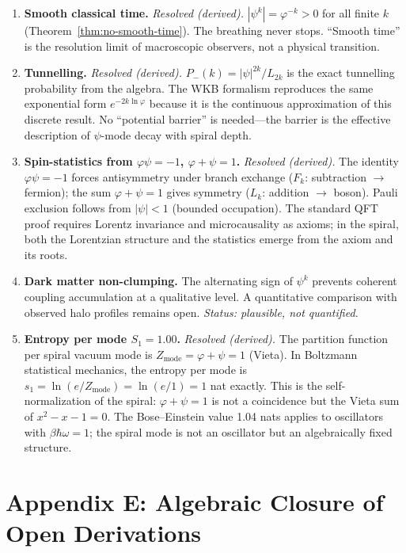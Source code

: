 \documentclass[12pt,a4paper]{article}
\begin{document}
\begin{enumerate}
\item \textbf{Smooth classical time.} \emph{Resolved (derived).} $|\psi^k| = \varphi^{-k} > 0$ for all finite $k$ (Theorem~\ref{thm:no-smooth-time}). The breathing never stops. ``Smooth time'' is the resolution limit of macroscopic observers, not a physical transition.

\item \textbf{Tunnelling.} \emph{Resolved (derived).} $P_-(k) = |\psi|^{2k}/L_{2k}$ is the exact tunnelling probability from the algebra. The WKB formalism reproduces the same exponential form $e^{-2k\ln\varphi}$ because it is the continuous approximation of this discrete result. No ``potential barrier'' is needed---the barrier is the effective description of $\psi$-mode decay with spiral depth.

\item \textbf{Spin-statistics from $\varphi\psi = -1$, $\varphi+\psi = 1$.} \emph{Resolved (derived).} The identity $\varphi\psi = -1$ forces antisymmetry under branch exchange ($F_k$: subtraction $\to$ fermion); the sum $\varphi+\psi = 1$ gives symmetry ($L_k$: addition $\to$ boson). Pauli exclusion follows from $|\psi| < 1$ (bounded occupation). The standard QFT proof requires Lorentz invariance and microcausality as axioms; in the spiral, both the Lorentzian structure and the statistics emerge from the axiom and its roots.

\item \textbf{Dark matter non-clumping.} The alternating sign of $\psi^k$ prevents coherent coupling accumulation at a qualitative level. A quantitative comparison with observed halo profiles remains open. \emph{Status: plausible, not quantified.}

\item \textbf{Entropy per mode $S_1 = 1.00$.} \emph{Resolved (derived).} The partition function per spiral vacuum mode is $Z_{\mathrm{mode}} = \varphi + \psi = 1$ (Vieta). In Boltzmann statistical mechanics, the entropy per mode is $s_1 = \ln(e/Z_{\mathrm{mode}}) = \ln(e/1) = 1$ nat exactly. This is the self-normalization of the spiral: $\varphi + \psi = 1$ is not a coincidence but the Vieta sum of $x^2 - x - 1 = 0$. The Bose--Einstein value 1.04 nats applies to oscillators with $\beta\hbar\omega = 1$; the spiral mode is not an oscillator but an algebraically fixed structure.
\end{enumerate}

\section*{Appendix E: Algebraic Closure of Open Derivations}
\label{sec:app-algebraic-closure}
\end{document}
